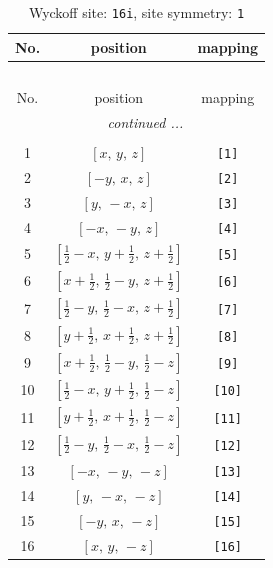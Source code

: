 \documentclass[fleqn,8pt]{jsarticle}
\begin{document}
\begin{longtable}{ccc}
\caption{Wyckoff site: {\tt 16i}, site symmetry: {\tt 1}}
 \\
 \hline \hline
No. & position & mapping \\ \hline \endfirsthead

\multicolumn{2}{l}{\tablename\ \thetable{}} \\
 \hline \hline
No. & position & mapping \\ \hline \endhead

 \hline \hline
\multicolumn{2}{r}{\footnotesize\it continued ...} \\ \endfoot

 \hline \hline
\multicolumn{2}{r}{} \\ \endlastfoot

1 & $\left[ x,\, y,\, z \right]$ & {\tt [1]} \\ \hline
2 & $\left[ - y,\, x,\, z \right]$ & {\tt [2]} \\ \hline
3 & $\left[ y,\, - x,\, z \right]$ & {\tt [3]} \\ \hline
4 & $\left[ - x,\, - y,\, z \right]$ & {\tt [4]} \\ \hline
5 & $\left[ \frac{1}{2} - x,\, y + \frac{1}{2},\, z + \frac{1}{2} \right]$ & {\tt [5]} \\ \hline
6 & $\left[ x + \frac{1}{2},\, \frac{1}{2} - y,\, z + \frac{1}{2} \right]$ & {\tt [6]} \\ \hline
7 & $\left[ \frac{1}{2} - y,\, \frac{1}{2} - x,\, z + \frac{1}{2} \right]$ & {\tt [7]} \\ \hline
8 & $\left[ y + \frac{1}{2},\, x + \frac{1}{2},\, z + \frac{1}{2} \right]$ & {\tt [8]} \\ \hline
9 & $\left[ x + \frac{1}{2},\, \frac{1}{2} - y,\, \frac{1}{2} - z \right]$ & {\tt [9]} \\ \hline
10 & $\left[ \frac{1}{2} - x,\, y + \frac{1}{2},\, \frac{1}{2} - z \right]$ & {\tt [10]} \\ \hline
11 & $\left[ y + \frac{1}{2},\, x + \frac{1}{2},\, \frac{1}{2} - z \right]$ & {\tt [11]} \\ \hline
12 & $\left[ \frac{1}{2} - y,\, \frac{1}{2} - x,\, \frac{1}{2} - z \right]$ & {\tt [12]} \\ \hline
13 & $\left[ - x,\, - y,\, - z \right]$ & {\tt [13]} \\ \hline
14 & $\left[ y,\, - x,\, - z \right]$ & {\tt [14]} \\ \hline
15 & $\left[ - y,\, x,\, - z \right]$ & {\tt [15]} \\ \hline
16 & $\left[ x,\, y,\, - z \right]$ & {\tt [16]} \\
\end{longtable}
\end{document}
